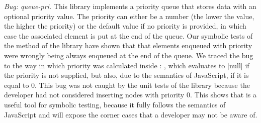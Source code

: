 \smallskip
\noindent \emph{Bug: queue-pri.} This library implements a priority queue that stores data with an optional priority value.
The priority can either be a number (the lower the value, the higher the priority) or the default  value if no priority is provided, in which case the associated element is put at the end of the queue. Our symbolic tests of the  method of the library have shown that that elements enqueued with priority  were wrongly being always enqueued at the end of the queue. We traced the bug to the way in which priority was calculated inside : , which evaluates to \jsinline|null| if the priority is not supplied, but also, due to the semantics of JavaScript, if it is equal to 0. This bug was not caught by the unit tests of the library because the developer had not considered inserting nodes with priority 0. This shows that \cosette is a useful tool for symbolic testing, because it fully follows the semantics of JavaScript and will expose the corner cases that a developer may not be aware of.


